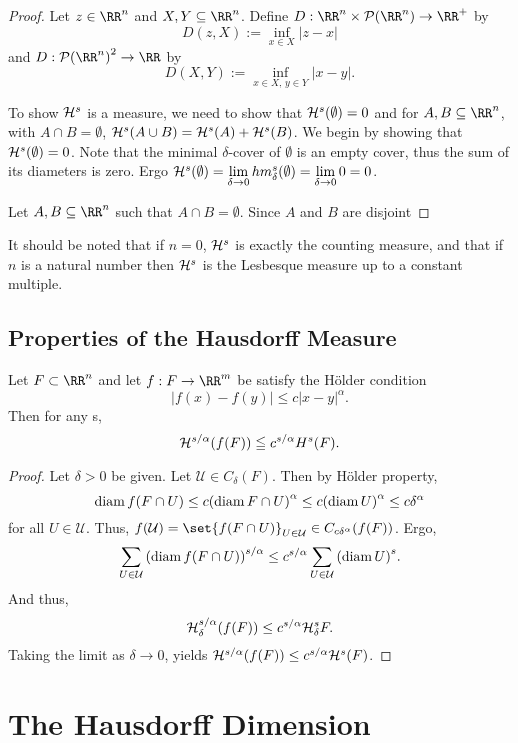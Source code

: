 \begin{proof}
	Let $z\in\RR^n$ and $X, Y\subseteq\RR^n$.
	Define $D:\RR^n\times\mathcal{P}(\RR^n)\rightarrow\RR^+$ by
	\[
		D(z,X) := \inf_{x\in X} |z-x|
	\]
	and $D:{\mathcal{P}(\RR^n)}^2\rightarrow\RR$ by
	\[
		D(X,Y) := \inf_{x\in X,\, y\in Y} |x-y|.
	\]

	To show $\mathcal{H}^s$ is a measure, we need to show that $\mathcal{H}^s(\emptyset)=0$ and for $A,B\subseteq\RR^n$, with $A\cap B=\emptyset$, $\mathcal{H}^s(A\cup B)=\mathcal{H}^s(A)+\mathcal{H}^s(B)$.
	We begin by showing that $\mathcal{H}^s(\emptyset)=0$.
	Note that the minimal $\delta$-cover of $\emptyset$ is an empty cover, thus the sum of its diameters is zero.
	Ergo $\mathcal{H}^s(\emptyset)=\lim\limits_{\delta\rightarrow 0} hm^s_\delta(\emptyset)=\lim\limits_{\delta\rightarrow 0} 0 =0$.

	Let $A,B\subseteq\RR^n$ such that $A\cap B=\emptyset$.
	Since $A$ and $B$ are disjoint

\end{proof}

It should be noted that if $n=0$, $\mathcal{H}^s$ is exactly the counting measure, and that if $n$ is a natural number then $\mathcal{H}^s$ is the Lesbesque measure up to a constant multiple.

\subsection{Properties of the Hausdorff Measure}

\begin{thm}
	Let $F\subset\RR^n$ and let $f: F\rightarrow\RR^m$ be satisfy the H\"older condition
	\[
		|f(x)-f(y)| \leq c|x-y|^\alpha.
	\]
	Then for any s,
	\[
		\mathcal{H}^{s/\alpha}(f(F))\leqq c^{s/\alpha}H^s(F).
	\]
\end{thm}
\begin{proof}
	Let $\delta>0$ be given.
	Let $\mathcal{U}\in C_\delta(F)$.
	Then by H\"older property,
	\[
		\operatorname{diam} f(F\cap U)\leq c{(\operatorname{diam} F\cap U)}^\alpha \leq c{(\operatorname{diam} U)}^\alpha\leq c\delta^\alpha
	\]
	for all $U\in\mathcal{U}$.
	Thus, $f(\mathcal{U})=\set{f(F\cap U)}_{U\in\mathcal U}\in C_{c\delta^\alpha}(f(F))$.
	Ergo,
	\[
		\sum_{U\in\mathcal{U}} {(\operatorname{diam} f(F\cap U))}^{s/\alpha}\leq c^{s/\alpha}\sum_{U\in\mathcal{U}}{(\operatorname{diam} U)}^s.
	\]
	And thus,
	\[
		\mathcal{H}^{s/\alpha}_\delta (f(F)) \leq c^{s/\alpha}\mathcal{H}^s_\delta F.
	\]
	Taking the limit as $\delta\rightarrow 0$, yields $\mathcal{H}^{s/\alpha}(f(F))\leq c^{s/\alpha}\mathcal{H}^s(F)$.
\end{proof}

\section{The Hausdorff Dimension}

